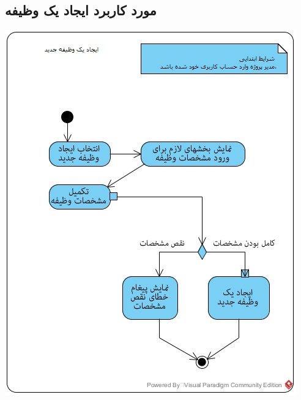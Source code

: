 \subsection*{مورد کاربرد ایجاد یک وظیفه}
\vspace{2cm}
\begin{center}
\includegraphics[width=\textwidth]{ActivityDiagrams/18.jpg}
\end{center}

\newpage
\vspace{2cm}
